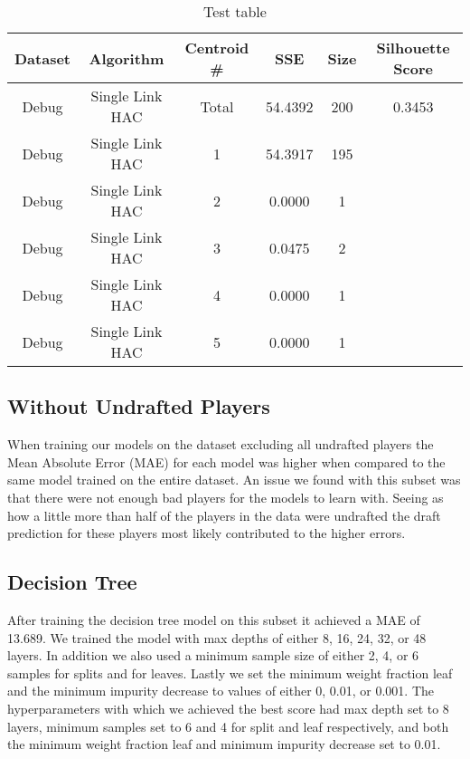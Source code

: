 \documentclass{article}
\begin{document}
\begin{table*}
	\begin{center}
		\begin{tabular}{||c c c c c c||} 
		\hline\hline
		Dataset & Algorithm & Centroid \# & SSE & Size & Silhouette Score \\ 
		\hline\hline
		Debug & Single Link HAC & Total & 54.4392 & 200 & 0.3453 \\ \hline
		Debug & Single Link HAC & 1 & 54.3917 & 195 & \\ \hline
		Debug & Single Link HAC & 2 & 0.0000 & 1 & \\ \hline
		Debug & Single Link HAC & 3 & 0.0475 & 2 & \\ \hline
		Debug & Single Link HAC & 4 & 0.0000 & 1 & \\ \hline
		Debug & Single Link HAC & 5 & 0.0000 & 1 & \\ \hline
		\hline\hline
		\end{tabular}
	\end{center}
	\caption{Test table}
	\label{tab:test_table}
\end{table*}

\subsection{Without Undrafted Players}

When training our models on the dataset excluding all undrafted players the Mean
Absolute Error (MAE) for each model was higher when compared to the same model
trained on the entire dataset. An issue we found with this subset was that there
were not enough bad players for the models to learn with. Seeing as how a little
more than half of the players in the data were undrafted the draft prediction
for these players most likely contributed to the higher errors.

\subsection{Decision Tree}

After training the decision tree model on this subset it achieved a MAE of
13.689. We trained the model with max depths of either 8, 16, 24, 32, or 48
layers. In addition we also used a minimum sample size of either 2, 4, or 6
samples for splits and for leaves. Lastly we set the minimum weight fraction
leaf and the minimum impurity decrease to values of either 0, 0.01, or 0.001.
The hyperparameters with which we achieved the best score had max depth set to 8
layers, minimum samples set to 6 and 4 for split and leaf respectively, and both
the minimum weight fraction leaf and minimum impurity decrease set to 0.01.
\end{document}
